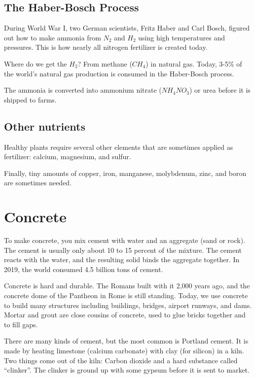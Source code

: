 \subsection{The Haber-Bosch Process}

During World War I, two German scientists, Fritz Haber and Carl Bosch,
figured out how to make ammonia from $N_2$ and $H_2$ using high
temperatures and pressures. This is how nearly all nitrogen fertilizer
is created today.

Where do we get the $H_2$? From methane ($CH_4$) in natural gas. Today, 3-5\%
of the world's natural gas production is consumed in the Haber-Bosch
process.

The ammonia is converted into ammonium nitrate ($NH_4NO_3$) or urea
before it is shipped to farms.

\subsection{Other nutrients}

Healthy plants require several other elements that are sometimes
applied as fertilizer: calcium, magnesium, and sulfur.

Finally, tiny amounts of copper, iron, manganese, molybdenum, zinc, and
boron are sometimes needed.



\section{Concrete}
To make concrete, you mix cement with water and an aggregate (sand or
rock).  The cement is usually only about 10 to 15 percent of the
mixture. The cement reacts with the water, and the resulting solid
binds the aggregate together. In 2019, the world consumed 4.5 billion
tons of cement. 

Concrete is hard and durable. The Romans built with it 2,000 years ago, and the concrete dome of the Pantheon in Rome is still standing. Today, we use concrete to
build many structures including buildings, bridges, airport runways,
and dams. Mortar and grout are close cousins of concrete, used to glue bricks together and to fill gaps.


There are many kinds of cement, but the most common is Portland
cement. It is made by heating limestone (calcium carbonate) with clay
(for silicon) in a kiln. Two things come out of the kiln: Carbon
dioxide and a hard substance called ``clinker''.  The clinker is
ground up with some gypsum before it is sent to market. 

